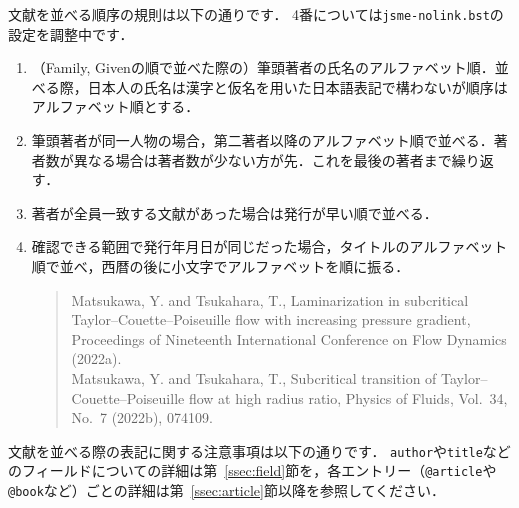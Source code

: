 \documentclass[a4paper,fleqn,uplatex,dvipdfmx]{jsarticle}
\makeatletter
\newcommand{\jsmefile}{\texttt{jsme-nolink.bst}}
\newcommand{\ttarticle}{\texttt{@article}}
\newcommand{\ttbook}{\texttt{@book}}
\makeatother
\begin{document}
文献を並べる順序の規則は以下の通りです．
4番については\jsmefile の設定を調整中です．
\begin{itembox}[l]{}
    \begin{enumerate}
        \item （Family, Givenの順で並べた際の）筆頭著者の氏名のアルファベット順．並べる際，日本人の氏名は漢字と仮名を用いた日本語表記で構わないが順序はアルファベット順とする．
        \item 筆頭著者が同一人物の場合，第二著者以降のアルファベット順で並べる．著者数が異なる場合は著者数が少ない方が先．これを最後の著者まで繰り返す．
        \item 著者が全員一致する文献があった場合は発行が早い順で並べる．
        \item 確認できる範囲で発行年月日が同じだった場合，タイトルのアルファベット順で並べ，西暦の後に小文字でアルファベットを順に振る．
        \begin{quote}
            Matsukawa, Y. and Tsukahara, T., Laminarization in subcritical Taylor--Couette--Poiseuille flow with increasing pressure gradient, Proceedings of Nineteenth International Conference on Flow Dynamics (2022a). \\
            Matsukawa, Y. and Tsukahara, T., Subcritical transition of Taylor--Couette--Poiseuille flow at high radius ratio, Physics of Fluids, Vol.~34, No.~7 (2022b), 074109.
        \end{quote}
    \end{enumerate}
\end{itembox}
文献を並べる際の表記に関する注意事項は以下の通りです．
\verb|author|や\verb|title|などのフィールドについての詳細は第~\ref{ssec:field}節を，各エントリー（\ttarticle や\ttbook など）ごとの詳細は第~\ref{ssec:article}節以降を参照してください．
\end{document}
